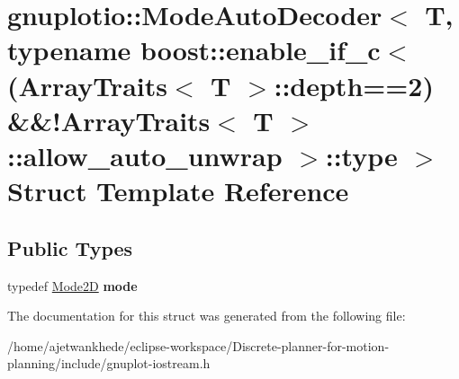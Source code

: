 \hypertarget{structgnuplotio_1_1ModeAutoDecoder_3_01T_00_01typename_01boost_1_1enable__if__c_3_07ArrayTraits_37323ac081238177311f71c094f54a55}{}\section{gnuplotio\+:\+:Mode\+Auto\+Decoder$<$ T, typename boost\+:\+:enable\+\_\+if\+\_\+c$<$(Array\+Traits$<$ T $>$\+:\+:depth==2) \&\&!\+Array\+Traits$<$ T $>$\+:\+:allow\+\_\+auto\+\_\+unwrap $>$\+:\+:type $>$ Struct Template Reference}
\label{structgnuplotio_1_1ModeAutoDecoder_3_01T_00_01typename_01boost_1_1enable__if__c_3_07ArrayTraits_37323ac081238177311f71c094f54a55}
\subsection*{Public Types}
\begin{DoxyCompactItemize}
\item 
\mbox{\label{structgnuplotio_1_1ModeAutoDecoder_3_01T_00_01typename_01boost_1_1enable__if__c_3_07ArrayTraits_37323ac081238177311f71c094f54a55_a4a741dbcbd1404fdfef24420a7867d26}} 
typedef \mbox{\hyperlink{structgnuplotio_1_1Mode2D}{Mode2D}} {\bfseries mode}
\end{DoxyCompactItemize}


The documentation for this struct was generated from the following file\+:\begin{DoxyCompactItemize}
\item 
/home/ajetwankhede/eclipse-\/workspace/\+Discrete-\/planner-\/for-\/motion-\/planning/include/gnuplot-\/iostream.\+h\end{DoxyCompactItemize}
